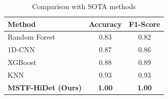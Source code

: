 \begin{table}[htbp]
\centering
\caption{Comparison with SOTA methods}
\begin{tabular}{lcc}
\hline
Method & Accuracy & F1-Score \\
\hline
Random Forest & 0.83 & 0.82 \\
1D-CNN & 0.87 & 0.86 \\
XGBoost & 0.88 & 0.89 \\
KNN & 0.93 & 0.93 \\
\textbf{MSTF-HiDet (Ours)} & \textbf{1.00} & \textbf{1.00} \\
\hline
\end{tabular}
\end{table}